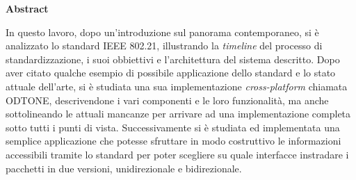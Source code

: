 \begin{center}
\LARGE{\textbf{Abstract}}
\end{center}
\vspace{3em}
In questo lavoro, dopo un'introduzione sul panorama contemporaneo, si è analizzato lo standard IEEE 802.21, illustrando la {\em timeline} del processo di standardizzazione, i suoi obbiettivi e l'architettura del sistema descritto. Dopo aver citato qualche esempio di possibile applicazione dello standard e lo stato attuale dell'arte, si è studiata una sua implementazione {\em cross-platform} chiamata ODTONE, descrivendone i vari componenti e le loro funzionalità, ma anche sottolineando le attuali mancanze per arrivare ad una implementazione completa sotto tutti i punti di vista. Successivamente si è studiata ed implementata una semplice applicazione che potesse sfruttare in modo costruttivo le informazioni accessibili tramite lo standard per poter scegliere su quale interfacce instradare i pacchetti in due versioni, unidirezionale e bidirezionale.